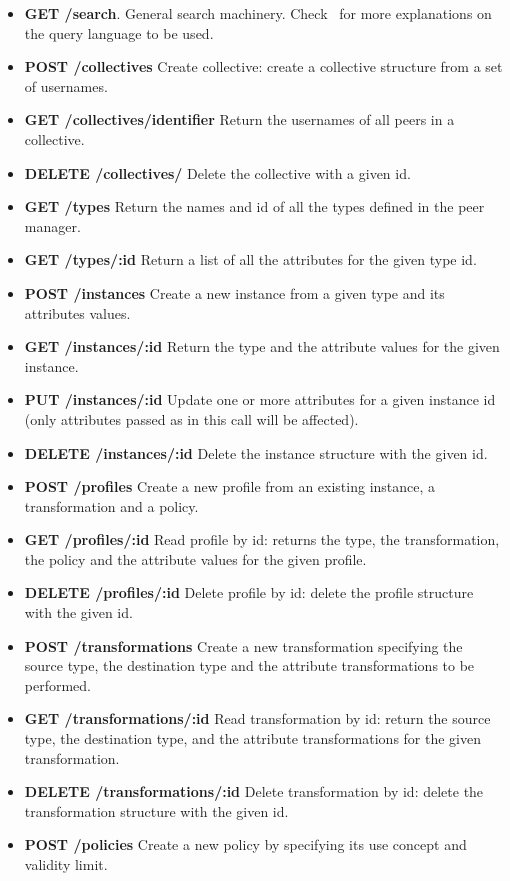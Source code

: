 \begin{itemize}
\item {\bf GET /search}. General search machinery. Check~\cite{D4.3} for more explanations on the query language to be used. 	
\item {\bf POST /collectives} Create collective: create a collective structure from a set of usernames.
\item {\bf GET /collectives/identifier}	Return the usernames of all peers in a collective.				
\item {\bf DELETE /collectives/} Delete the collective with a given id.	
\item {\bf GET /types} Return the names and id of all the types defined in the peer manager.
\item {\bf GET /types/:id} Return a list of all the attributes for the given type id.
\item {\bf POST /instances} Create a new instance from a given type and its attributes values. 
\item {\bf GET /instances/:id} Return the type and the attribute values for the given instance.
\item {\bf PUT /instances/:id} Update one or more attributes for a given instance id (only attributes passed as in this call will be affected).											
\item {\bf DELETE /instances/:id } Delete the instance structure with the given id.						
\item {\bf POST /profiles} Create a new profile from an existing instance, a transformation and a policy.
\item {\bf GET /profiles/:id} Read profile by id: returns the type, the transformation, the policy and the attribute values for the given profile. 
\item {\bf DELETE /profiles/:id} Delete profile by id: delete the profile structure with the given id.	
\item {\bf POST /transformations}  Create a new transformation specifying the source type, the destination type and the attribute transformations to be performed.
\item {\bf GET /transformations/:id} Read transformation by id: return the source type, the destination type, and the attribute transformations for the given transformation.									
\item {\bf DELETE /transformations/:id} Delete transformation by id: delete the transformation structure with the given id.	
\item {\bf POST /policies} Create a new policy by specifying its use concept and validity limit.		

\end{itemize}

